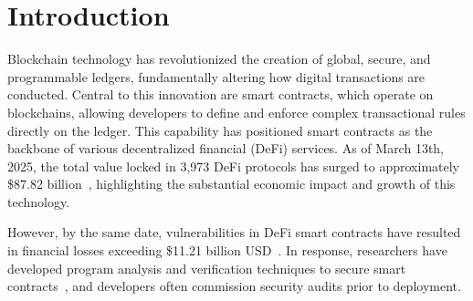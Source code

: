 \vspace{-2ex}
\section{Introduction} 
\label{sec:introduction}

Blockchain technology has revolutionized the creation of global, secure, and
programmable ledgers, fundamentally altering how digital transactions are
conducted. Central to this innovation are smart contracts, which operate on
blockchains, allowing developers to define and enforce complex
transactional rules directly on the ledger. This capability has positioned
smart contracts as the backbone of various decentralized
financial (DeFi) services. As of March 13th, 2025, the total value locked in
3,973 DeFi protocols has surged to approximately \$87.82
billion~\cite{defillama}, highlighting the substantial economic impact and
growth of this technology.

However, by the same date, vulnerabilities in DeFi smart contracts have resulted in 
financial losses exceeding \$11.21 billion USD~\cite{defillamahacks}. 
In response, researchers have developed program analysis and verification techniques 
to secure smart contracts~\cite{luu2016making, torres2018osiris, 
liu2018reguard, feist2019slither, zhang2019mpro, bose2022sailfish, 
ma2021pluto, zheng2022park, wang2024efficiently, albert2020taming, 
zhang2023your}, and developers often commission security audits prior to deployment.





